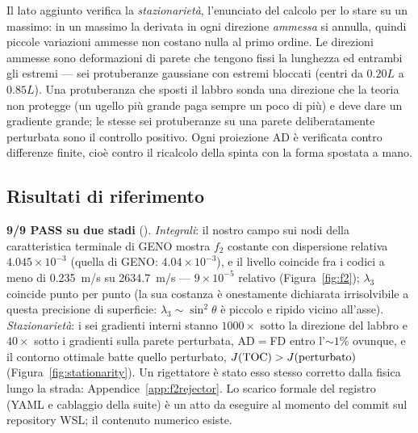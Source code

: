 Il lato aggiunto verifica la \emph{stazionarietà}, l'enunciato del
calcolo per lo stare su un massimo: in un massimo la derivata in ogni
direzione \emph{ammessa} si annulla, quindi piccole variazioni
ammesse non costano nulla al primo ordine. Le direzioni ammesse sono
deformazioni di parete che tengono fissi la lunghezza ed entrambi gli
estremi --- sei protuberanze gaussiane con estremi bloccati (centri
da $0.20L$ a $0.85L$). Una protuberanza che sposti il labbro sonda
una direzione che la teoria non protegge (un ugello più grande paga
sempre un poco di più) e deve dare un gradiente grande; le stesse sei
protuberanze su una parete deliberatamente perturbata sono il
controllo positivo. Ogni proiezione AD è verificata contro differenze
finite, cioè contro il ricalcolo della spinta con la forma spostata a
mano.

\subsection{Risultati di riferimento}

\textbf{9/9 PASS su due stadi}
(). \emph{Integrali}: il nostro
campo sui nodi della caratteristica terminale di GENO mostra $f_2$
costante con dispersione relativa $4.045\times10^{-3}$ (quella di
GENO: $4.04\times10^{-3}$), e il livello coincide fra i codici a meno
di 0.235~m/s su 2634.7~m/s --- $9\times10^{-5}$ relativo
(Figura~\ref{fig:f2}); $\lambda_3$ coincide punto per punto (la sua
costanza è onestamente dichiarata irrisolvibile a questa precisione
di superficie: $\lambda_3 \sim \sin^{2}\theta$ è piccolo e ripido
vicino all'asse). \emph{Stazionarietà}: i sei gradienti interni
stanno $1000\times$ sotto la direzione del labbro e $40\times$ sotto
i gradienti sulla parete perturbata, AD${}={}$FD entro l'${\sim}1\%$
ovunque, e il contorno ottimale batte quello perturbato,
$J({\rm TOC}) > J({\rm perturbato})$
(Figura~\ref{fig:stationarity}). Un rigettatore è stato esso stesso
corretto dalla fisica lungo la strada:
Appendice~\ref{app:f2rejector}. Lo scarico formale del registro
(YAML e cablaggio della suite) è un atto da eseguire al momento del
commit sul repository WSL; il contenuto numerico esiste.


